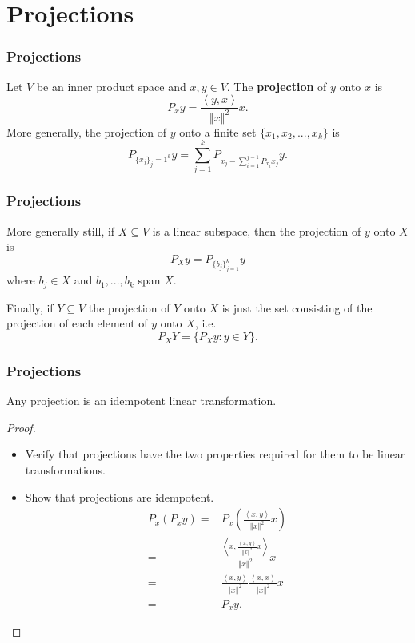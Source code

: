 \documentclass[compress]{beamer}
\newcommand{\iprod}[2]{\left\langle {#1} , {#2} \right\rangle}
\newcommand{\norm}[1]{\left\Vert {#1} \right\Vert}
\begin{document}
\section{Projections}

\begin{frame}
  \frametitle{Projections}
  \begin{definition}
    Let $V$ be an inner product space and $x,y \in V$. The
    \textbf{projection} of $y$ onto $x$ is 
    \[ P_x y = \frac{\iprod{y}{x}}{\norm{x}^2} x. \]
    More generally, the projection of $y$ onto a finite set $\{x_1, x_2,
    ... , x_k\}$ is 
    \[ P_{\{x_j\}_j=1^k} y = \sum_{j=1}^k P_{x_j - \sum_{i=1}^{j-1}
      P_{x_i} x_j} y. \]
  \end{definition}
\end{frame}

\begin{frame}
  \frametitle{Projections}
  \begin{definition}
    More generally still, if $X \subseteq V$ is a linear subspace, then
    the projection of $y$ onto $X$ is
    \[ P_{X} y = P_{\{b_j\}_{j=1}^k} y \]    
    where $b_j \in X$ and $b_1, ..., b_k$ span $X$. 
    
    Finally, if $Y \subseteq V$ the projection of $Y$ onto $X$ is just
    the set consisting of the projection of each element of $y$ onto
    $X$, i.e.
    \[ P_{X} Y = \{ P_{X} y : y \in Y \}. \]
  \end{definition}
\end{frame}

\begin{frame}
  \frametitle{Projections}
  \begin{lemma}
    Any projection is an idempotent linear transformation. 
  \end{lemma}
  \begin{proof}
    \begin{itemize}
    \item Verify that projections have the two properties required
      for them to be linear transformations.
    \item Show that projections are idempotent. 
      \begin{align*}
        P_x (P_x y) = & P_x\left(\frac{\iprod{x}{y}}{\norm{x}^2} x \right)
        \\
        = & \frac{\iprod{x}{\frac{\iprod{x}{y}}{\norm{x}^2}
            x}}{\norm{x}^2} x \\ 
        = & \frac{\iprod{x}{y}}{\norm{x}^2}
        \frac{\iprod{x}{x}}{\norm{x}^2} x \\
        = & P_x y.
      \end{align*}
    \end{itemize}
  \end{proof}
\end{frame}
\end{document}
